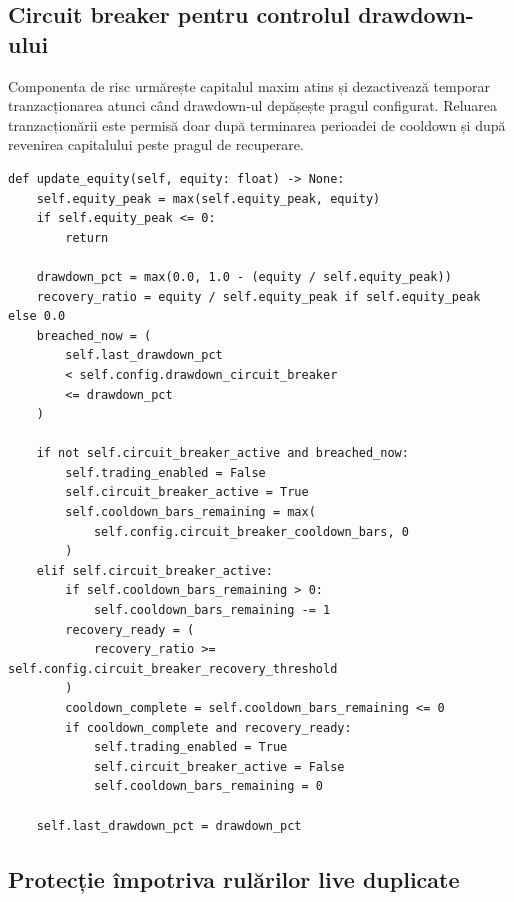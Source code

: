 \subsection{Circuit breaker pentru controlul drawdown-ului}
\label{anexa:cod_circuit_breaker}

Componenta de risc urmărește capitalul maxim atins și dezactivează temporar tranzacționarea atunci când drawdown-ul depășește pragul configurat. Reluarea tranzacționării este permisă doar după terminarea perioadei de cooldown și după revenirea capitalului peste pragul de recuperare.

\begin{code}
\begin{verbatim}
def update_equity(self, equity: float) -> None:
    self.equity_peak = max(self.equity_peak, equity)
    if self.equity_peak <= 0:
        return

    drawdown_pct = max(0.0, 1.0 - (equity / self.equity_peak))
    recovery_ratio = equity / self.equity_peak if self.equity_peak else 0.0
    breached_now = (
        self.last_drawdown_pct
        < self.config.drawdown_circuit_breaker
        <= drawdown_pct
    )

    if not self.circuit_breaker_active and breached_now:
        self.trading_enabled = False
        self.circuit_breaker_active = True
        self.cooldown_bars_remaining = max(
            self.config.circuit_breaker_cooldown_bars, 0
        )
    elif self.circuit_breaker_active:
        if self.cooldown_bars_remaining > 0:
            self.cooldown_bars_remaining -= 1
        recovery_ready = (
            recovery_ratio >= self.config.circuit_breaker_recovery_threshold
        )
        cooldown_complete = self.cooldown_bars_remaining <= 0
        if cooldown_complete and recovery_ready:
            self.trading_enabled = True
            self.circuit_breaker_active = False
            self.cooldown_bars_remaining = 0

    self.last_drawdown_pct = drawdown_pct
\end{verbatim}
\caption{Mecanism de tip circuit breaker pe baza drawdown-ului}
\label{code:anexa_circuit_breaker}
\end{code}

\subsection{Protecție împotriva rulărilor live duplicate}
\label{anexa:cod_live_lock}

